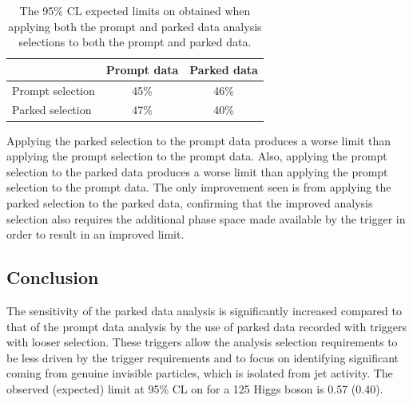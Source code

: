 \begin{table}
  \caption{The 95\% CL expected limits on \BRinv obtained when applying both the prompt and parked data analysis selections to both the prompt and parked data.}
  \label{tab:promptvsparked}
  \begin{tabular}{lcc}
    \hline\hline
    & Prompt data & Parked data \\
    \hline
    Prompt selection & 45\% & 46\% \\
    Parked selection & 47\% & 40\% \\
    \hline\hline
  \end{tabular}
\end{table}

Applying the parked selection to the prompt data produces a worse limit than applying the prompt selection to the prompt data. Also, applying the prompt selection to the parked data produces a worse limit than applying the prompt selection to the prompt data. The only improvement seen is from applying the parked selection to the parked data, confirming that the improved analysis selection also requires the additional phase space made available by the trigger in order to result in an improved limit.

\subsection{Conclusion}
The sensitivity of the parked data analysis is significantly increased compared to that of the prompt data analysis by the use of parked data recorded with triggers with looser selection. These triggers allow the analysis selection requirements to be less driven by the trigger requirements and to focus on identifying significant \MET coming from genuine invisible particles, which is isolated from jet activity. The observed (expected) limit at 95\% \ac{CL} on \BRinv for a 125 \GeV Higgs boson is 0.57 (0.40).
